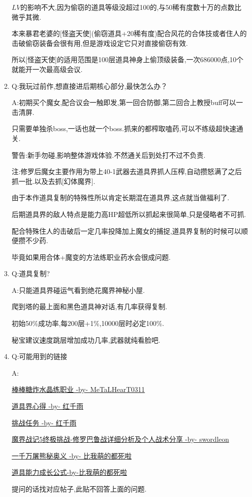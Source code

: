 \begin{enumerate}
	$LV$的影响不大,因为偷窃的道具等级没超过100的,与50稀有度数十万的点数比微乎其微.

	本来暴君老婆的[怪盗天使](偷窃道具+20稀有度)配合风花的合体技或者住人的击破偷窃装备会很有用,但是游戏设定它只对直接偷窃有效.

	所以[怪盗天使]的适用范围是100层道具神身上偷顶级装备,一次686000点,10个就能开一次最高级会议.

	\item
	Q:我玩过前作,想直接进后期核心部分,最快怎么办？

	A:初期买个魔女,配合议会一触即发,第一回合防御,第二回合上教授buff可以一击清屏.

	只需要单独杀boss,一话也就一个boss.抓来的都榨取嗑药,可以不练级超快速通关.

	警告:新手勿碰,影响整体游戏体验.不然通关后到处打不过不负责.

	注:修罗后魔女主要作用为带上40-1武器去道具界抓人压榨,自动攒怒满了之后抓一批.以及去抓[幻体魔界].

	由于本作道具复制的特殊性所以肯定长期混在道具界,这点就当做福利了.

	后期道具界的敌人特点是能力高HP超低所以抓起来很简单,只是侵略者不可抓.

	配合特殊住人的击破后一定几率投降加上魔女的捕捉,道具界复制的时候可以顺便攒不少药.

	毕竟如果用合体+魔变的方法练职业药水会很成问题.


	\item
	Q:道具复制?

	A:只能道具界碰运气看到绝花魔界神秘小屋.

	爬到塔的最上面和黑色道具神对话,有几率获得复制.

	初始50\%成功率,每200层+1\%,10000层时必定100\%.

	秘宝建议速度跳层增加成功几率,武器就纯看脸吧.

	\item
	Q:可能用到的链接

	A:

	\href{http://tieba.baidu.com/p/3717431968}{棒棒糖炸水晶练职业 -by- MeTaLHearT0311}

	\href{http://tieba.baidu.com/p/3730196003}{道具界心得 -by- 红千雨}

	\href{http://tieba.baidu.com/p/3723862919}{挑战任务 -by- 红千雨}

	\href{http://tieba.baidu.com/p/3949061316}{魔界战记5终极挑战-修罗巴鲁战详细分析及个人战术分享 -by- swordleon}

	\href{http://tieba.baidu.com/p/3825275063}{一千万屠熊秘奥义 -by- 比我萌的都死啦}

	\href{http://tieba.baidu.com/f?kz=3834692385}{道具能力成长公式-by-比我萌的都死啦}

	提问的话找对应帖子,此贴不回答上面的问题.

\end{enumerate}


